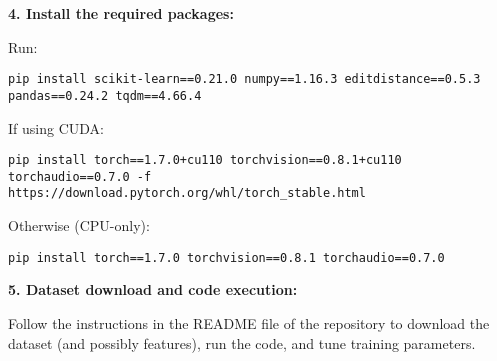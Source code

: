 \vspace{1em}
\textbf{4. Install the required packages:}

Run:
\begin{lstlisting}
pip install scikit-learn==0.21.0 numpy==1.16.3 editdistance==0.5.3 pandas==0.24.2 tqdm==4.66.4
\end{lstlisting}

If using CUDA:
\begin{lstlisting}
pip install torch==1.7.0+cu110 torchvision==0.8.1+cu110 torchaudio==0.7.0 -f https://download.pytorch.org/whl/torch_stable.html
\end{lstlisting}

Otherwise (CPU-only):
\begin{lstlisting}
pip install torch==1.7.0 torchvision==0.8.1 torchaudio==0.7.0
\end{lstlisting}

\vspace{1em}
\textbf{5. Dataset download and code execution:}

Follow the instructions in the README file of the repository to download the dataset (and possibly features), run the code, and tune training parameters.



